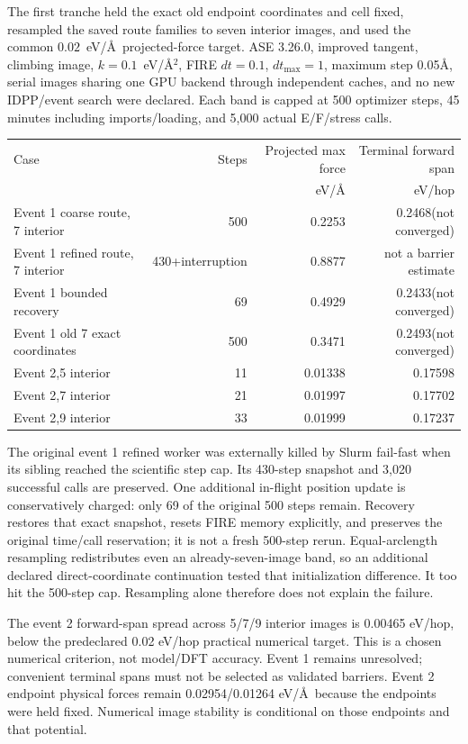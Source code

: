 \documentclass[10pt]{article}
\begin{document}
The first tranche held the exact old endpoint coordinates and cell fixed,
resampled the saved route families to seven interior images, and used the common
$0.02$~eV/\AA\ projected-force target. ASE 3.26.0, improved tangent, climbing image,
$k=0.1$~eV/\AA$^2$, FIRE $dt=0.1$, $dt_{\max}=1$, maximum step 0.05\AA,
serial images sharing one GPU backend through independent caches, and no new
IDPP/event search were declared. Each band is capped at 500 optimizer steps,
45 minutes including imports/loading, and 5,000 actual E/F/stress calls.

\begin{center}\small
\begin{tabular}{p{.35\linewidth}rrr}\toprule
Case&Steps&Projected max force&Terminal forward span\\
& &eV/\AA&eV/hop\\\midrule
Event 1 coarse route, 7 interior&500&0.2253&0.2468(not converged)\\
Event 1 refined route, 7 interior&430+interruption&0.8877&not a barrier estimate\\
Event 1 bounded recovery&69&0.4929&0.2433(not converged)\\
Event 1 old 7 exact coordinates&500&0.3471&0.2493(not converged)\\
Event 2,5 interior&11&0.01338&0.17598\\
Event 2,7 interior&21&0.01997&0.17702\\
Event 2,9 interior&33&0.01999&0.17237\\\bottomrule
\end{tabular}
\end{center}
The original event 1 refined worker was externally killed by Slurm fail-fast when
its sibling reached the scientific step cap. Its 430-step snapshot and 3,020
successful calls are preserved. One additional in-flight position update is
conservatively charged: only 69 of the original 500 steps remain. Recovery restores
that exact snapshot, resets FIRE memory explicitly, and preserves the original
time/call reservation; it is not a fresh 500-step rerun. Equal-arclength resampling
redistributes even an already-seven-image band, so an additional declared
direct-coordinate continuation tested that initialization difference. It too
hit the 500-step cap. Resampling alone therefore does not explain the failure.

The event 2 forward-span spread across 5/7/9 interior images is 0.00465 eV/hop, below
the predeclared 0.02 eV/hop practical numerical target. This is a chosen numerical
criterion, not model/DFT accuracy. Event 1 remains unresolved; convenient terminal
spans must not be selected as validated barriers. Event 2 endpoint physical forces
remain 0.02954/0.01264 eV/\AA\ because the endpoints were held fixed. Numerical
image stability is conditional on those endpoints and that potential.
\newpage
\end{document}

